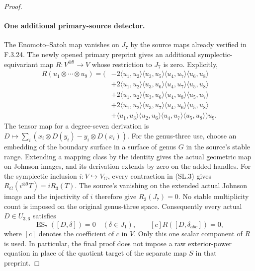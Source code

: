 \begin{proof}
\paragraph{One additional primary-source detector.}
The Enomoto--Satoh map vanishes on $J_7$ by the source maps already
verified in F.3.24. The newly opened primary preprint
\cite[Propositions~4.1--4.2, p.~11]{AuditMoritaSakasaiSuzuki2026v1}
gives an additional symplectic-equivariant map
$R:V^{\otimes9}\to V$ whose restriction to $J_7$ is zero.
Explicitly,
\[
\begin{split}
 R(u_1\otimes\cdots\otimes u_9)
  =\bigl(&-2\langle u_1,u_2\rangle\langle u_3,u_5\rangle
                \langle u_4,u_7\rangle\langle u_6,u_8\rangle\\
         &+2\langle u_1,u_2\rangle\langle u_3,u_6\rangle
                \langle u_4,u_7\rangle\langle u_5,u_8\rangle\\
         &+2\langle u_1,u_2\rangle\langle u_3,u_6\rangle
                \langle u_4,u_8\rangle\langle u_5,u_7\rangle\\
         &+2\langle u_1,u_2\rangle\langle u_3,u_7\rangle
                \langle u_4,u_6\rangle\langle u_5,u_8\rangle\\
         &+\langle u_1,u_3\rangle\langle u_2,u_6\rangle
                \langle u_4,u_7\rangle\langle u_5,u_8\rangle\bigr)u_9.
\end{split}                                                   \tag{SL.3}
\]
The tensor map for a degree-seven derivation is
$D\mapsto\sum_i(x_i\otimes D(y_i)-y_i\otimes D(x_i))$.
For the genus-three use, choose an embedding of the boundary surface
in a surface of genus $G$ in the source's stable range. Extending a
mapping class by the identity gives the actual geometric map on
Johnson images, and its derivation extends by zero on the added
handles. For the symplectic inclusion $i:V\hookrightarrow V_G$,
every contraction in (SL.3) gives
$R_G(i^{\otimes9}T)=iR_3(T)$. The source's vanishing on the
extended actual Johnson image and the injectivity of $i$ therefore
give $R_3(J_7)=0$. No stable multiplicity count is imposed on
the original genus-three space.
Consequently every actual $D\in U_{3,6}$ satisfies
\[
 \operatorname{ES}_7([D,\delta])=0\quad(\delta\in J_1),
 \qquad [c]R([D,\delta_{abc}])=0,                         \tag{SL.4}
\]
where $[c]$ denotes the coefficient of $c$ in $V$.
Only this one scalar component of $R$ is used. In particular, the
final proof does not impose a raw exterior-power equation in place
of the quotient target of the separate map $S$ in that preprint.


\end{proof}
